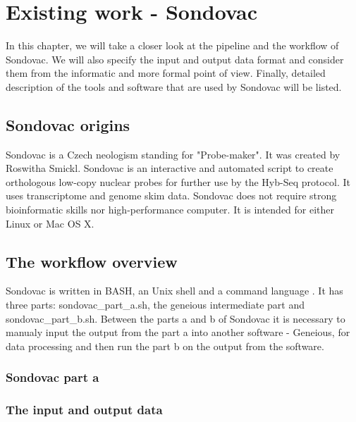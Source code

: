 \chapter[Existing work - Sondovac]{Existing work - Sondovac}
\label{kap:existing_work}

In this chapter, we will take a closer look at the pipeline and the workflow of Sondovac. We 
will also specify the input and output data format and consider them from the informatic and 
more formal point of view. Finally, detailed description of the tools and software that are used by 
Sondovac will be listed. 

\section{Sondovac origins}

Sondovac is a Czech neologism standing for "Probe-maker". It was created by Roswitha Smickl. 
Sondovac is an interactive and automated script to create orthologous low-copy nuclear 
probes for further use by the Hyb-Seq protocol. It uses transcriptome and genome skim data. 
Sondovac does not require strong bioinformatic skills nor high-performance computer. It is 
intended for either Linux or Mac OS X. 

\section{The workflow overview}

Sondovac is written in BASH, an Unix shell and a command language \cite{bash}. It has three 
parts: sondovac\_part\_a.sh, the geneious \cite{geneious} intermediate part and sondovac\_part\_b.sh. Between 
the parts a and b of Sondovac it is necessary to manualy input the output from the part a into 
another software - Geneious, for data processing and then run the part b on the output from the software. 


\subsection{Sondovac part a}%

\subsection{The input and output data}


